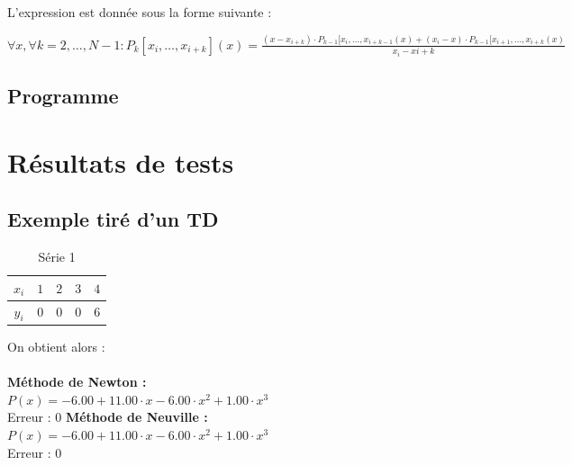 \documentclass{report}
\begin{document}
	L'expression est donnée sous la forme suivante : 
	
	$\forall x, \forall k=2,\ldots,N-1 : P_{k}[x_{i},\ldots,x_{i+k}](x) = \frac{(x-x_{i+k}) \cdot P_{k-1}[x_{i},\ldots,x_{i+k-1}(x) + (x_{i}-x) \cdot P_{k-1}[x_{i+1},\ldots,x_{i+k}(x)}{x_{i}-x{i+k}} $ 
      \subsection{Programme}
	
    \newpage
    \section{Résultats de tests}
      \subsection{Exemple tiré d'un TD}
	\begin{table}[h]
	  \centering
	  \begin{tabular}{| c | c | c | c | c |}
	  \hline 
	  $x_{i}$ & $1$ & $2$ & $3$ & $4$ \\ 
	  \hline 
	  $y_{i}$ & $0$ & $0$ & $0$ & $6$ \\ 
	  \hline 
	  \end{tabular}
	  \caption{Série 1}
	  \label{inter_td3_ex3}
	\end{table}
	
	On obtient alors :\\ \\
	\textbf{Méthode de Newton :}\\
	$P(x)= -6.00 + 11.00 \cdot x- 6.00 \cdot x^{2}  + 1.00 \cdot x^{3} $\\
	Erreur : $0$
	\newline
	\newline
	\textbf{Méthode de Neuville :}\\
	$P(x)= -6.00 + 11.00 \cdot x- 6.00 \cdot x^{2}  + 1.00 \cdot x^{3} $\\
	Erreur : $0$
	\newline
	\newline
	
\end{document}
